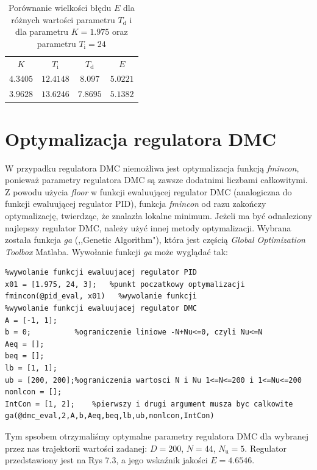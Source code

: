 \begin{table}
	[b] \caption{Porównanie wielkości błędu $E$ dla różnych wartości parametru $T_{\mathrm{d}}$ i dla parametru $K=1.975$ oraz parametru $T_{\mathrm{i}}=24$}
	\label{t_T_i}
	\centering
	\begin{small}
		\begin{tabular}{|c|c|c|c|}
			\hline
			$K$					&	$T_{\mathrm{i}}$	&	$T_{\mathrm{d}}$	&	$E$				\\
			$\num{4.3405}$		&	$\num{12.4148}$	&	$\num{8.097}$		&	$\num{5.0221}$	\\
			$\num{3.9628}$		&	$\num{13.6246}$	&	$\num{7.8695}$		&	$\num{5.1382}$	\\
			\hline
			\end{tabular}
	\end{small}
\end{table}

\section{Optymalizacja regulatora DMC}


W przypadku regulatora DMC niemożliwa jest optymalizacja funkcją \emph{fmincon}, ponieważ parametry regulatora DMC są zawsze dodatnimi liczbami całkowitymi. Z powodu użycia \emph{floor} w funkcji ewaluującej regulator DMC (analogiczna do funkcji ewaluującej regulator PID), funkcja \emph{fmincon} od razu zakończy optymalizację, twierdząc, że znalazła lokalne minimum. Jeżeli ma być odnaleziony najlepszy regulator DMC, należy użyć innej metody optymalizacji. Wybrana została funkcja \emph{ga} (,,Genetic Algorithm"), która jest częścią \emph{Global Optimization Toolbox} Matlaba. Wywołanie funkcji \emph{ga} może wyglądać tak:

\begin{lstlisting}
%wywolanie funkcji ewaluujacej regulator PID
x01 = [1.975, 24, 3];   %punkt poczatkowy optymalizacji
fmincon(@pid_eval, x01)   %wywolanie funkcji
%wywolanie funkcji ewaluujacej regulator DMC
A = [-1, 1];      
b = 0;          %ograniczenie liniowe -N+Nu<=0, czyli Nu<=N
Aeq = [];
beq = [];
lb = [1, 1];
ub = [200, 200];%ograniczenia wartosci N i Nu 1<=N<=200 i 1<=Nu<=200
nonlcon = [];
IntCon = [1, 2];    %pierwszy i drugi argument musza byc calkowite
ga(@dmc_eval,2,A,b,Aeq,beq,lb,ub,nonlcon,IntCon)
\end{lstlisting}

Tym spsobem otrzymaliśmy optymalne parametry regulatora DMC dla wybranej przez nas trajektorii wartości zadanej: $D=200$, $N=44$, $N_{\mathrm{u}}=5$. Regulator przedstawiony jest na Rys 7.3, a jego wskaźnik jakości $E=\num{4.6546}$. 

